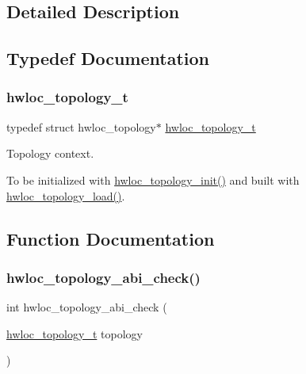\subsection{Detailed Description}


\subsection{Typedef Documentation}
\mbox{\label{a00186_ga9d1e76ee15a7dee158b786c30b6a6e38}} 
\subsubsection{\texorpdfstring{hwloc\+\_\+topology\+\_\+t}{hwloc\_topology\_t}}
{\footnotesize\ttfamily typedef struct hwloc\+\_\+topology$\ast$ \hyperlink{a00186_ga9d1e76ee15a7dee158b786c30b6a6e38}{hwloc\+\_\+topology\+\_\+t}}



Topology context. 

To be initialized with \hyperlink{a00186_ga03fd4a16d8b9ee1ffc32b25fd2f6bdfa}{hwloc\+\_\+topology\+\_\+init()} and built with \hyperlink{a00186_gabdf58d87ad77f6615fccdfe0535ff826}{hwloc\+\_\+topology\+\_\+load()}. 

\subsection{Function Documentation}
\mbox{\label{a00186_ga0647ae66458fe68172eb5a320042f870}} 
\subsubsection{\texorpdfstring{hwloc\+\_\+topology\+\_\+abi\+\_\+check()}{hwloc\_topology\_abi\_check()}}
{\footnotesize\ttfamily int hwloc\+\_\+topology\+\_\+abi\+\_\+check (\begin{DoxyParamCaption}\item[{\hyperlink{a00186_ga9d1e76ee15a7dee158b786c30b6a6e38}{hwloc\+\_\+topology\+\_\+t}}]{topology }\end{DoxyParamCaption})}




